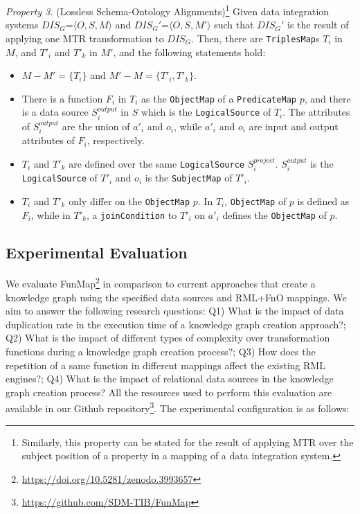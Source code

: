 \noindent\textit{Property 3.} (Lossless Schema-Ontology Alignments)\footnote{Similarly, this property can be stated for the result of applying MTR over the subject position of a property in a mapping of a data integration system.}
\label{property:p3}
Given data integration systems $DIS_G$=$\langle O,S,M\rangle$ and  $DIS_G'$=$\langle O,S,M'\rangle$ such that $DIS_G'$ is the result of applying one MTR transformation to $DIS_G$. Then, there are \verb|TriplesMap|s $T_i$ in $M$, 
and  $T'_i$ and $T'_k$ in $M'$, and the following statements hold:
\begin{itemize}
    \item $M - M'=\{T_i\}$ and $M'- M=\{T'_i,T'_k\}$. 
    \item There is a function $F_i$ in $T_i$ as the \verb|ObjectMap| of a  \verb|PredicateMap| $p$, and there is a data source $S_i^{output}$ in $S$ which is the \verb|LogicalSource| of $T_i$. The attributes of $S_i^{output}$ are the union of $a'_i$ and $o_i$, while $a'_i$ and $o_i$ are input and output attributes of $F_i$, respectively.
    \item $T_i$ and $T'_k$ are defined over the same \verb|LogicalSource|  $S_i^{project}$. $S_i^{output}$ is the \verb|LogicalSource| of $T'_i$ and $o_i$ is the \verb|SubjectMap| of $T'_i$.  
    \item $T_i$ and $T'_k$ only differ on the \verb|ObjectMap| $p$. In $T_i$, \verb|ObjectMap| of $p$ is defined as $F_i$, while in $T'_k$, a \verb|joinCondition| to $T'_i$ on $a'_i$ defines the \verb|ObjectMap| of $p$. 
\end{itemize}


\subsection{Experimental Evaluation}

We evaluate FunMap\footnote{\url{https://doi.org/10.5281/zenodo.3993657}} in comparison to current approaches that create a knowledge graph using the specified data sources and RML+FnO mappings. We aim to answer the following research questions: 
Q1) What is the impact of data duplication rate in the execution time of a knowledge graph creation approach?; Q2) What is the impact of different types of complexity over transformation functions during a knowledge graph creation process?; Q3) How does the repetition of a same function in different mappings affect the existing RML engines?; Q4) What is the impact of relational data sources in the knowledge graph creation process?
All the resources used to perform this evaluation are available in our Github repository\footnote{\url{https://github.com/SDM-TIB/FunMap}}. The experimental configuration is as follows:

